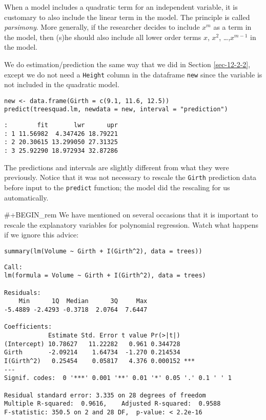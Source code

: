 \begin{rem}
When a model includes a quadratic term for an independent variable, it
is customary to also include the linear term in the model. The
principle is called \emph{parsimony}. More generally, if the researcher
decides to include \(x^{m}\) as a term in the model, then (s)he should
also include all lower order terms \(x\), \(x^{2}\), \ldots{},\(x^{m-1}\)
in the model.
\end{rem}

We do estimation/prediction the same way that we did in Section
\ref{sec-12-2-2}, except we do not need a \texttt{Height} column
in the dataframe \texttt{new} since the variable is not included in the
quadratic model.

\begin{verbatim}
new <- data.frame(Girth = c(9.1, 11.6, 12.5))
predict(treesquad.lm, newdata = new, interval = "prediction")
\end{verbatim}

\begin{verbatim}
:        fit       lwr      upr
: 1 11.56982  4.347426 18.79221
: 2 20.30615 13.299050 27.31325
: 3 25.92290 18.972934 32.87286
\end{verbatim}

The predictions and intervals are slightly different from what they
were previously. Notice that it was not necessary to rescale the
\texttt{Girth} prediction data before input to the \texttt{predict} function; the
model did the rescaling for us automatically.

\#+BEGIN\_rem
We have mentioned on several occasions that it is important to rescale
the explanatory variables for polynomial regression. Watch what
happens if we ignore this advice:

\begin{verbatim}
summary(lm(Volume ~ Girth + I(Girth^2), data = trees))
\end{verbatim}

\begin{verbatim}
Call:
lm(formula = Volume ~ Girth + I(Girth^2), data = trees)

Residuals:
    Min      1Q  Median      3Q     Max 
-5.4889 -2.4293 -0.3718  2.0764  7.6447 

Coefficients:
            Estimate Std. Error t value Pr(>|t|)    
(Intercept) 10.78627   11.22282   0.961 0.344728    
Girth       -2.09214    1.64734  -1.270 0.214534    
I(Girth^2)   0.25454    0.05817   4.376 0.000152 ***
---
Signif. codes:  0 '***' 0.001 '**' 0.01 '*' 0.05 '.' 0.1 ' ' 1

Residual standard error: 3.335 on 28 degrees of freedom
Multiple R-squared:  0.9616,	Adjusted R-squared:  0.9588 
F-statistic: 350.5 on 2 and 28 DF,  p-value: < 2.2e-16
\end{verbatim}

